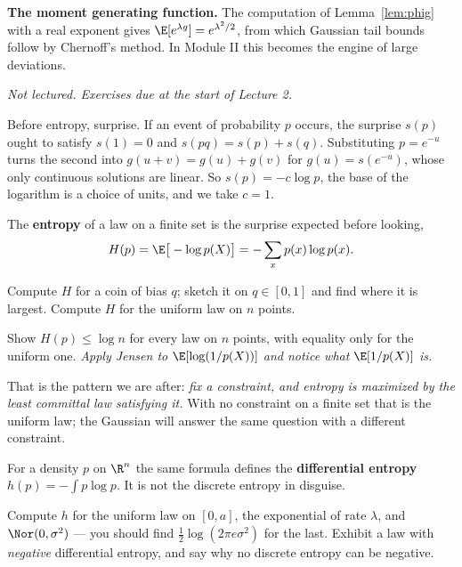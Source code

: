 \documentclass[11pt]{article}
\begin{document}
\textbf{The moment generating function.} The computation of Lemma~\ref{lem:phig} with a real exponent gives $\E[e^{\lambda g}]=e^{\lambda^2/2}$, from which Gaussian tail bounds follow by Chernoff's method. In Module II this becomes the engine of large deviations.

\label{sec:entropy}

\emph{Not lectured. Exercises due at the start of Lecture 2.}

Before entropy, surprise. If an event of probability $p$ occurs, the surprise $s(p)$ ought to satisfy $s(1)=0$ and $s(pq)=s(p)+s(q)$. Substituting $p=e^{-u}$ turns the second into $g(u+v)=g(u)+g(v)$ for $g(u)=s(e^{-u})$, whose only continuous solutions are linear. So $s(p)=-c\log p$, the base of the logarithm is a choice of units, and we take $c=1$.

The \textbf{entropy} of a law on a finite set is the surprise expected before looking,
\[
H(p)=\E\big[-\log p(X)\big]=-\sum_xp(x)\log p(x).
\]

\begin{exercise}[\ty{A}]
Compute $H$ for a coin of bias $q$; sketch it on $q\in[0,1]$ and find where it is largest. Compute $H$ for the uniform law on $n$ points.
\end{exercise}

\begin{exercise}[\ty{B}]
Show $H(p)\le\log n$ for every law on $n$ points, with equality only for the uniform one. \emph{Apply Jensen to $\E[\log(1/p(X))]$ and notice what $\E[1/p(X)]$ is.}
\end{exercise}

That is the pattern we are after: \emph{fix a constraint, and entropy is maximized by the least committal law satisfying it.} With no constraint on a finite set that is the uniform law; the Gaussian will answer the same question with a different constraint.

For a density $p$ on $\R^n$ the same formula defines the \textbf{differential entropy} $h(p)=-\int p\log p$. It is not the discrete entropy in disguise.

\begin{exercise}[\ty{A}]
Compute $h$ for the uniform law on $[0,a]$, the exponential of rate $\lambda$, and $\Nor(0,\sigma^2)$ --- you should find $\tfrac12\log(2\pi e\sigma^2)$ for the last. Exhibit a law with \emph{negative} differential entropy, and say why no discrete entropy can be negative.
\end{exercise}
\end{document}
